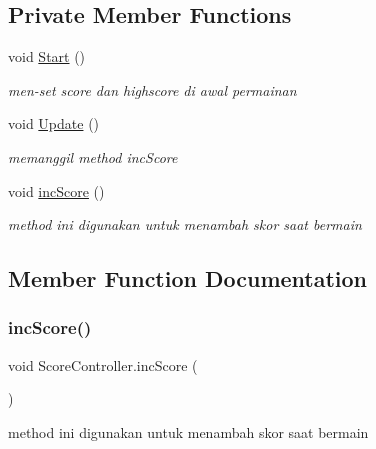 \subsection*{Private Member Functions}
\begin{DoxyCompactItemize}
\item 
void \hyperlink{class_score_controller_a24c8b4f29b0e90a9bf721023cd1c581d}{Start} ()
\begin{DoxyCompactList}\small\item\em men-\/set score dan highscore di awal permainan \end{DoxyCompactList}\item 
void \hyperlink{class_score_controller_a30682b0eb78ea3820856810083221ee6}{Update} ()
\begin{DoxyCompactList}\small\item\em memanggil method inc\+Score \end{DoxyCompactList}\item 
void \hyperlink{class_score_controller_a9af998d59d5024890bc86f91e5ce276e}{inc\+Score} ()
\begin{DoxyCompactList}\small\item\em method ini digunakan untuk menambah skor saat bermain \end{DoxyCompactList}\end{DoxyCompactItemize}


\subsection{Member Function Documentation}
\hypertarget{class_score_controller_a9af998d59d5024890bc86f91e5ce276e}{}\label{class_score_controller_a9af998d59d5024890bc86f91e5ce276e} 
\subsubsection{\texorpdfstring{inc\+Score()}{incScore()}}
{\footnotesize\ttfamily void Score\+Controller.\+inc\+Score (\begin{DoxyParamCaption}{ }\end{DoxyParamCaption})\hspace{0.3cm}{\ttfamily [private]}}



method ini digunakan untuk menambah skor saat bermain 

\hypertarget{class_score_controller_a24c8b4f29b0e90a9bf721023cd1c581d}{}\label{class_score_controller_a24c8b4f29b0e90a9bf721023cd1c581d} 
